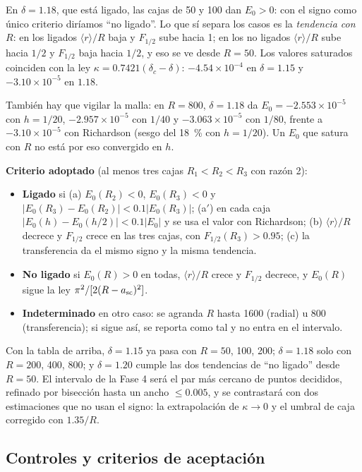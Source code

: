 \documentclass[11pt]{article}
\newcommand{\dc}{\delta_c}
\begin{document}
En $\delta=1.18$, que está ligado, las cajas de 50 y 100 dan $E_0>0$: con el signo como único criterio diríamos ``no ligado''. Lo que sí separa los casos es la \emph{tendencia con $R$}: en los ligados $\langle r\rangle/R$ baja y $F_{1/2}$ sube hacia 1; en los no ligados $\langle r\rangle/R$ sube hacia $1/2$ y $F_{1/2}$ baja hacia $1/2$, y eso se ve desde $R=50$. Los valores saturados coinciden con la ley $\kappa=0.7421(\dc-\delta)$: $-4.54\times10^{-4}$ en $\delta=1.15$ y $-3.10\times10^{-5}$ en $1.18$.

También hay que vigilar la malla: en $R=800$, $\delta=1.18$ da $E_0=-2.553\times10^{-5}$ con $h=1/20$, $-2.957\times10^{-5}$ con $1/40$ y $-3.063\times10^{-5}$ con $1/80$, frente a $-3.10\times10^{-5}$ con Richardson (sesgo del 18~\% con $h=1/20$). Un $E_0$ que satura con $R$ no está por eso convergido en $h$.

\textbf{Criterio adoptado} (al menos tres cajas $R_1<R_2<R_3$ con razón 2):
\begin{itemize}
\item \textbf{Ligado} si (a) $E_0(R_2)<0$, $E_0(R_3)<0$ y $|E_0(R_3)-E_0(R_2)|<0.1|E_0(R_3)|$; (a$'$) en cada caja $|E_0(h)-E_0(h/2)|<0.1|E_0|$ y se usa el valor con Richardson; (b) $\langle r\rangle/R$ decrece y $F_{1/2}$ crece en las tres cajas, con $F_{1/2}(R_3)>0.95$; (c) la transferencia da el mismo signo y la misma tendencia.
\item \textbf{No ligado} si $E_0(R)>0$ en todas, $\langle r\rangle/R$ crece y $F_{1/2}$ decrece, y $E_0(R)$ sigue la ley $\pi^2/[2(R-a_{\rm sc})^2]$.
\item \textbf{Indeterminado} en otro caso: se agranda $R$ hasta 1600 (radial) u 800 (transferencia); si sigue así, se reporta como tal y no entra en el intervalo.
\end{itemize}
Con la tabla de arriba, $\delta=1.15$ ya pasa con $R=50$, 100, 200; $\delta=1.18$ solo con $R=200$, 400, 800; y $\delta=1.20$ cumple las dos tendencias de ``no ligado'' desde $R=50$. El intervalo de la Fase 4 será el par más cercano de puntos decididos, refinado por bisección hasta un ancho $\le0.005$, y se contrastará con dos estimaciones que no usan el signo: la extrapolación de $\kappa\to0$ y el umbral de caja corregido con $1.35/R$.

\subsection{Controles y criterios de aceptación}
\label{sec:controles}
\end{document}
